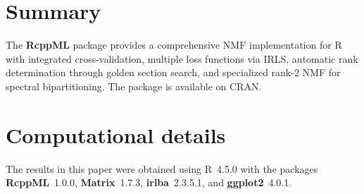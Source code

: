 \documentclass[11pt]{article}
\newcommand{\proglang}[1]{\textsf{#1}}
\newcommand{\pkg}[1]{\textbf{#1}}
\begin{document}
\section{Summary} \label{sec:summary}

The \pkg{RcppML} package provides a comprehensive NMF implementation for 
\proglang{R} with integrated cross-validation, multiple loss functions via IRLS, 
automatic rank determination through golden section search, and specialized 
rank-2 NMF for spectral bipartitioning. The package is available on CRAN.



\section*{Computational details}

The results in this paper were obtained using \proglang{R}~4.5.0 with the 
packages \pkg{RcppML}~1.0.0, \pkg{Matrix}~1.7.3, \pkg{irlba}~2.3.5.1, and 
\pkg{ggplot2}~4.0.1.





\end{document}

